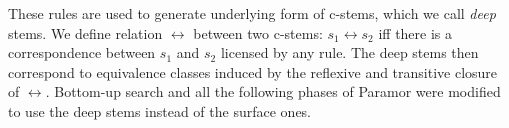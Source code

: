 \documentclass[11pt]{article}
\newcommand{\todojd}[1]{} %
\begin{document}
\noindent

\noindent
These rules are used to generate underlying form of c-stems, which we call \emph{deep} stems.  We define relation $\leftrightarrow$ between two c-stems: $s_1 \leftrightarrow s_2$ iff there is a correspondence between $s_1$ and $s_2$ licensed by any rule. The deep stems then correspond to equivalence classes induced by the reflexive and transitive closure of $\leftrightarrow$.
%
%
%
Bottom-up search and all the following phases of Paramor were modified to use the deep stems instead of the surface ones.
\end{document}
